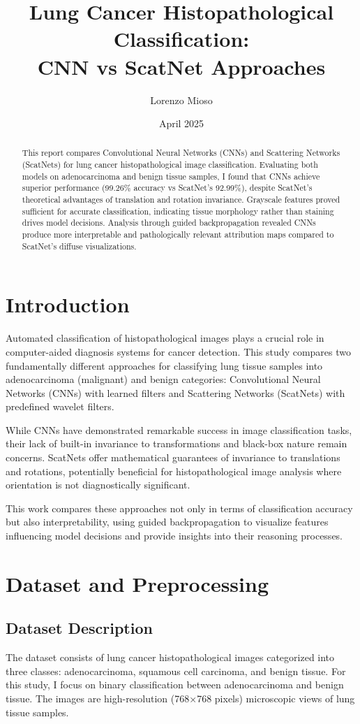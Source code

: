 \documentclass[10pt,twocolumn]{article}
\title{Lung Cancer Histopathological Classification: \\CNN vs ScatNet Approaches}
\author{Lorenzo Mioso}
\date{April 2025}
\begin{document}
\maketitle

\begin{abstract}
This report compares Convolutional Neural Networks (CNNs) and Scattering Networks (ScatNets) for lung cancer histopathological image classification. Evaluating both models on adenocarcinoma and benign tissue samples, I found that CNNs achieve superior performance (99.26\% accuracy vs ScatNet's 92.99\%), despite ScatNet's theoretical advantages of translation and rotation invariance. Grayscale features proved sufficient for accurate classification, indicating tissue morphology rather than staining drives model decisions. Analysis through guided backpropagation revealed CNNs produce more interpretable and pathologically relevant attribution maps compared to ScatNet's diffuse visualizations.
\end{abstract}

\section{Introduction}
Automated classification of histopathological images plays a crucial role in computer-aided diagnosis systems for cancer detection. This study compares two fundamentally different approaches for classifying lung tissue samples into adenocarcinoma (malignant) and benign categories: Convolutional Neural Networks (CNNs) with learned filters and Scattering Networks (ScatNets) with predefined wavelet filters.

While CNNs have demonstrated remarkable success in image classification tasks, their lack of built-in invariance to transformations and black-box nature remain concerns. ScatNets offer mathematical guarantees of invariance to translations and rotations, potentially beneficial for histopathological image analysis where orientation is not diagnostically significant.

This work compares these approaches not only in terms of classification accuracy but also interpretability, using guided backpropagation to visualize features influencing model decisions and provide insights into their reasoning processes.

\section{Dataset and Preprocessing}
\subsection{Dataset Description}
The dataset consists of lung cancer histopathological images categorized into three classes: adenocarcinoma, squamous cell carcinoma, and benign tissue. For this study, I focus on binary classification between adenocarcinoma and benign tissue. The images are high-resolution (768×768 pixels) microscopic views of lung tissue samples.
\end{document}
